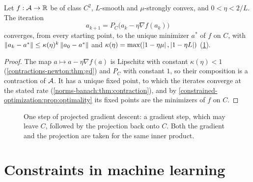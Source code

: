 \begin{notechapter}
\begin{theorem}
\label{constrained-optimization:thm:pgd}
Let $f:\mathcal{A}\to\mathbb{R}$ be of class $C^2$, $L$-smooth and $\mu$-strongly
convex, and $0 < \eta < 2/L$. The iteration
\[
  a_{k+1} = P_C\bigl(a_k - \eta\nabla f(a_k)\bigr)
\]
converges, from every starting point, to the unique minimizer $a^*$ of
$f$ on $C$, with $\left\|a_k - a^*\right\|\leq\kappa(\eta)^k\left\|a_0 - a^*\right\|$ and
$\kappa(\eta) = \max(\left|1 - \eta\mu\right|, \left|1 - \eta L\right|)$
(\cref{constrained-optimization:fig:pgd}).
\end{theorem}

\begin{proof}
The map $a\mapsto a - \eta\nabla f(a)$ is Lipschitz with constant
$\kappa(\eta) < 1$ (\cref{contractions-newton:thm:gd}) and $P_C$ with
constant $1$, so their composition is a contraction of $\mathcal{A}$. It has a
unique fixed point, to which the iterates converge at the stated rate
(\cref{norms-banach:thm:contraction}), and by
\cref{constrained-optimization:prop:optimality} its fixed points are the
minimizers of $f$ on $C$.
\end{proof}

\begin{figure}[ht]
\centering
{}
\caption{One step of projected gradient descent: a gradient step, which
may leave $C$, followed by the projection back onto $C$. Both the
gradient and the projection are taken for the same inner product.}
\label{constrained-optimization:fig:pgd}
\end{figure}

\section{Constraints in machine learning}
\label{constrained-optimization:sec:ml}


\end{notechapter}
